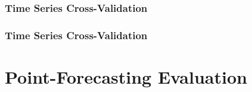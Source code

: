 \documentclass{beamer}
\begin{document}
\begin{frame}
  \frametitle{Time Series Cross-Validation}
  \end{frame}

\begin{frame}
  \frametitle{Time Series Cross-Validation}
  \end{frame}


\section{Point-Forecasting Evaluation}
\end{document}
